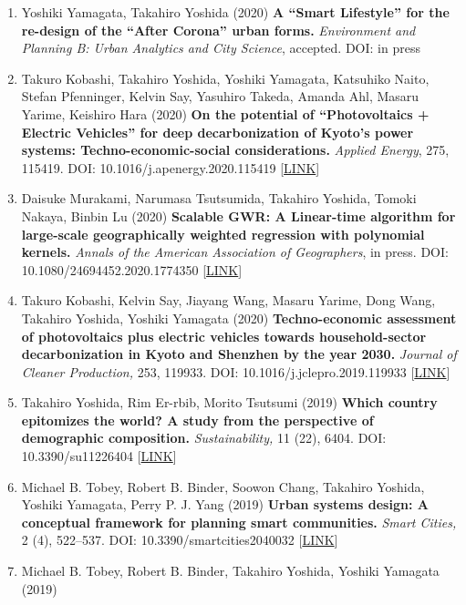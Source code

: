 \documentclass[]{book}
\providecommand{\tightlist}{%
  \setlength{\itemsep}{0pt}\setlength{\parskip}{0pt}}
\begin{document}
\begin{enumerate}
\def\labelenumi{\arabic{enumi}.}
\tightlist
\item
  Yoshiki Yamagata, Takahiro Yoshida (2020)
  \textbf{A ``Smart Lifestyle'' for the re-design of the ``After Corona'' urban forms.}
  \emph{Environment and Planning B: Urban Analytics and City Science}, accepted.
  DOI: in press
\item
  Takuro Kobashi, Takahiro Yoshida, Yoshiki Yamagata, Katsuhiko Naito, Stefan Pfenninger, Kelvin Say, Yasuhiro Takeda, Amanda Ahl, Masaru Yarime, Keishiro Hara (2020)
  \textbf{On the potential of ``Photovoltaics + Electric Vehicles'' for deep decarbonization of Kyoto's power systems: Techno-economic-social considerations.}
  \emph{Applied Energy}, 275, 115419.
  DOI: 10.1016/j.apenergy.2020.115419 {[}\href{https://doi.org/10.1016/j.apenergy.2020.115419}{LINK}{]}
\item
  Daisuke Murakami, Narumasa Tsutsumida, Takahiro Yoshida, Tomoki Nakaya, Binbin Lu (2020)
  \textbf{Scalable GWR: A Linear-time algorithm for large-scale geographically weighted regression with polynomial kernels.}
  \emph{Annals of the American Association of Geographers}, in press.
  DOI: 10.1080/24694452.2020.1774350 {[}\href{https://www.tandfonline.com/doi/full/10.1080/24694452.2020.1774350}{LINK}{]}
\item
  Takuro Kobashi, Kelvin Say, Jiayang Wang, Masaru Yarime, Dong Wang, Takahiro Yoshida, Yoshiki Yamagata (2020)
  \textbf{Techno-economic assessment of photovoltaics plus electric vehicles towards household-sector decarbonization in Kyoto and Shenzhen by the year 2030.}
  \emph{Journal of Cleaner Production,} 253, 119933.
  DOI: 10.1016/j.jclepro.2019.119933 {[}\href{https://doi.org/10.1016/j.jclepro.2019.119933}{LINK}{]}
\item
  Takahiro Yoshida, Rim Er-rbib, Morito Tsutsumi (2019)
  \textbf{Which country epitomizes the world? A study from the perspective of demographic composition.}
  \emph{Sustainability,} 11 (22), 6404.
  DOI: 10.3390/su11226404 {[}\href{https://www.mdpi.com/2071-1050/11/22/6404}{LINK}{]}
\item
  Michael B. Tobey, Robert B. Binder, Soowon Chang, Takahiro Yoshida, Yoshiki Yamagata, Perry P. J. Yang (2019)
  \textbf{Urban systems design: A conceptual framework for planning smart communities.}
  \emph{Smart Cities,} 2 (4), 522--537.
  DOI: 10.3390/smartcities2040032 {[}\href{https://www.mdpi.com/2624-6511/2/4/32}{LINK}{]}
\item
  Michael B. Tobey, Robert B. Binder, Takahiro Yoshida, Yoshiki Yamagata (2019)

\end{enumerate}
\end{document}
